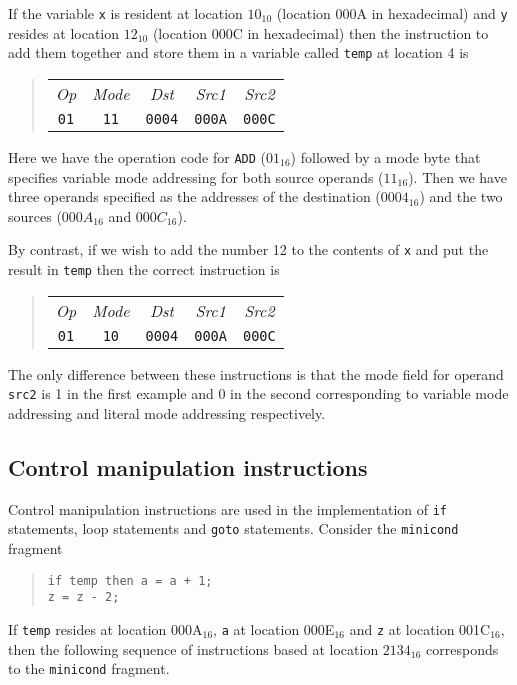 If the variable {\tt x} is resident at location $10_{10}$ (location 000A
in hexadecimal) and {\tt y} resides at location $12_{10}$ (location 000C
in hexadecimal) then the instruction to add them together and store them
in a variable called {\tt temp} at location 4 is
\begin{quote}
\begin{tabular}{ccccc}
\em Op&\em Mode&\em Dst&\em Src1&\em Src2\\
\tt 01&\tt 11&\tt 0004&\tt 000A&\tt 000C\\
\end{tabular}
\end{quote}
Here we have the operation code for {\tt ADD} ($01_{16}$) followed by a mode
byte that specifies  variable mode addressing for both source operands
($11_{16}$). Then we have three operands  specified as the addresses of the 
destination ($0004_{16}$) and the two sources ($000A_{16}$ and $000C_{16}$).

By contrast, if we wish to add the number 12 to the contents of {\tt x}
and put the result in {\tt temp} then the correct instruction is
\begin{quote}
\begin{tabular}{ccccc}
\em Op&\em Mode&\em Dst&\em Src1&\em Src2\\
\tt 01&\tt 10&\tt 0004&\tt 000A&\tt 000C\\
\end{tabular}
\end{quote}

The only difference between these instructions is that the mode field
for operand {\tt src2} is 1 in the first example and 0 in the second corresponding
to variable mode addressing and literal mode addressing respectively.

\subsection{Control manipulation instructions}

Control manipulation instructions are used in the implementation of {\tt if} statements,
loop statements and {\tt goto} statements. Consider the {\tt minicond} fragment 
\begin{quote}
\small
\begin{verbatim}
if temp then a = a + 1;
z = z - 2;
\end{verbatim}
\end{quote}
If {\tt temp} resides at location 000A$_{16}$, {\tt a} at location
000E$_{16}$ and  {\tt z} at location 001C$_{16}$, then the following sequence
of instructions based at location $2134_{16}$ corresponds to the {\tt minicond}
fragment.

